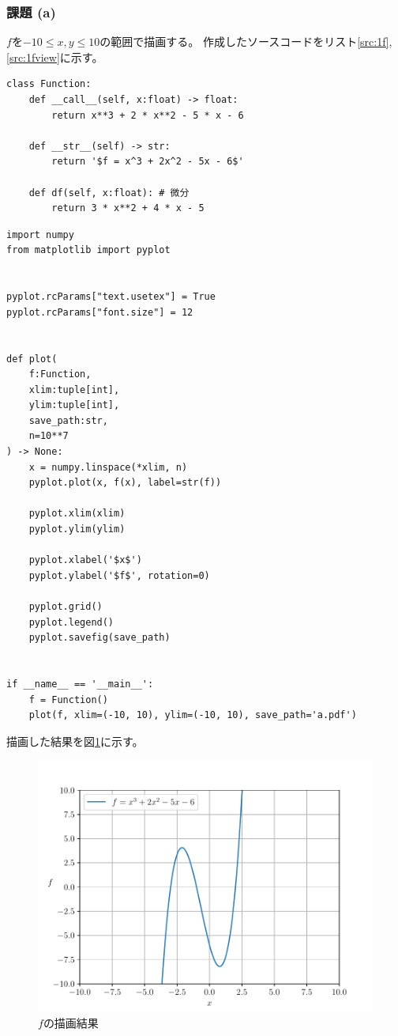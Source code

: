 \documentclass[a4j, titlepage]{jsarticle}
\numberwithin{equation}{section}
\begin{document}
        \subsubsection{課題 (a)}
            $f$を$-10\leq x,y\leq 10$の範囲で描画する。
            作成したソースコードをリスト\ref{src:1f}, \ref{src:1fview}に示す。
            \begin{lstlisting}[caption=$f$の実装, label=src:1f]
class Function:
    def __call__(self, x:float) -> float:
        return x**3 + 2 * x**2 - 5 * x - 6

    def __str__(self) -> str:
        return '$f = x^3 + 2x^2 - 5x - 6$'

    def df(self, x:float): # 微分
        return 3 * x**2 + 4 * x - 5
            \end{lstlisting}
            \begin{lstlisting}[caption=$f$を描画するソースコード, label=src:1fview]
import numpy
from matplotlib import pyplot


pyplot.rcParams["text.usetex"] = True
pyplot.rcParams["font.size"] = 12


def plot(
    f:Function,
    xlim:tuple[int],
    ylim:tuple[int],
    save_path:str,
    n=10**7
) -> None:
    x = numpy.linspace(*xlim, n)
    pyplot.plot(x, f(x), label=str(f))
    
    pyplot.xlim(xlim)
    pyplot.ylim(ylim)

    pyplot.xlabel('$x$')
    pyplot.ylabel('$f$', rotation=0)
    
    pyplot.grid()
    pyplot.legend()
    pyplot.savefig(save_path)


if __name__ == '__main__':
    f = Function()
    plot(f, xlim=(-10, 10), ylim=(-10, 10), save_path='a.pdf')                
            \end{lstlisting}

            描画した結果を図\ref{fig:1fview}に示す。

            \begin{figure}[h]
                \centering
                \includegraphics[width=0.8\hsize]{kadai1/a.pdf}
                \caption{$f$の描画結果}
                \label{fig:1fview}
            \end{figure}
\end{document}
